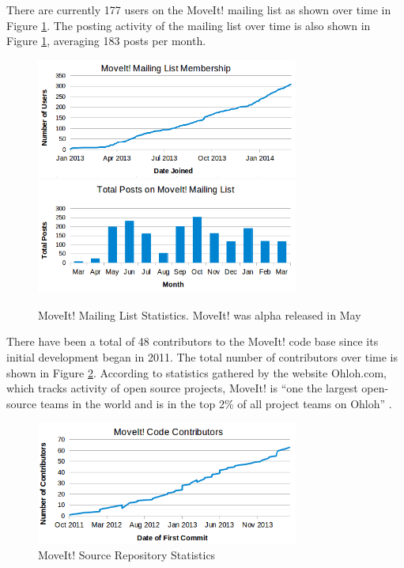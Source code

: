 \documentclass[10pt,journal,compsoc]{joser1}
\begin{document}
{There are currently 177 users on the MoveIt! mailing list as shown over time in
Figure \ref{fig:membership_plot}. The posting activity of the mailing list over
time is also shown in Figure \ref{fig:membership_plot}, averaging 183 posts per
month.

\begin{figure}[!t]
\centering
\includegraphics[width=3.4in]{coleman_20131110_f11}
\includegraphics[width=3.4in]{coleman_20131110_f12}
\caption{MoveIt! Mailing List Statistics. MoveIt! was alpha released in May}
\label{fig:membership_plot}
\end{figure}

There have been a total of 48 contributors to the MoveIt! code base since its
initial development began in 2011. The total number of contributors over time is
shown in Figure \ref{fig:contributors}. According to statistics gathered by the
website Ohloh.com, which tracks activity of open source projects, MoveIt! is
``one the largest open-source teams in the world and is in the top 2\% of all
project teams on Ohloh'' \cite{ohloh}.

\begin{figure}[!t]
\centering
\includegraphics[width=3.4in]{coleman_20131110_f13}
\caption{MoveIt! Source Repository Statistics}
\label{fig:contributors}
\end{figure}

}
\end{document}
